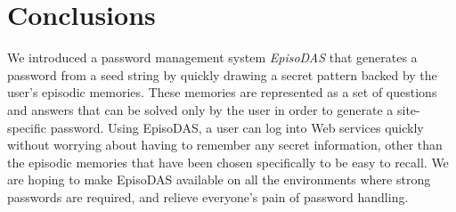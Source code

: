 \documentclass[sigconf]{acmart}
\begin{document}

\section{Conclusions}

We introduced a password management system \textit{EpisoDAS}
that generates a password from a seed string by
quickly drawing a secret pattern backed by the user's episodic memories.
These memories are represented as a set of questions and answers
that can be solved only by the user in order to generate a site-specific password.
%
Using EpisoDAS, a user can log into Web services quickly without
worrying about
having to remember any secret information, other than the episodic memories
that have been chosen specifically to be easy to recall.
%
We are hoping to make EpisoDAS available on all the environments
where strong passwords are required, and
relieve everyone's pain of password handling.

\large


\end{document}
